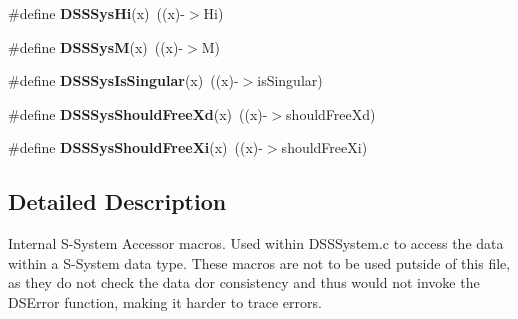 \begin{DoxyCompactItemize}
\item 
\hypertarget{group___d_s_s_sys_a_c_c_e_s_s_o_r_s_gaf5e511a390af70874397ef16b7224448}{
\#define {\bfseries DSSSysHi}(x)~((x)-\/$>$Hi)}
\label{group___d_s_s_sys_a_c_c_e_s_s_o_r_s_gaf5e511a390af70874397ef16b7224448}

\item 
\hypertarget{group___d_s_s_sys_a_c_c_e_s_s_o_r_s_ga7873f9a3eb4f5cd1cf9329d5c1823706}{
\#define {\bfseries DSSSysM}(x)~((x)-\/$>$M)}
\label{group___d_s_s_sys_a_c_c_e_s_s_o_r_s_ga7873f9a3eb4f5cd1cf9329d5c1823706}

\item 
\hypertarget{group___d_s_s_sys_a_c_c_e_s_s_o_r_s_ga105b46c63a24dec014dfe7072b56eac5}{
\#define {\bfseries DSSSysIsSingular}(x)~((x)-\/$>$isSingular)}
\label{group___d_s_s_sys_a_c_c_e_s_s_o_r_s_ga105b46c63a24dec014dfe7072b56eac5}

\item 
\hypertarget{group___d_s_s_sys_a_c_c_e_s_s_o_r_s_ga03d9bc589698f9ffecf61ca495f8d5b8}{
\#define {\bfseries DSSSysShouldFreeXd}(x)~((x)-\/$>$shouldFreeXd)}
\label{group___d_s_s_sys_a_c_c_e_s_s_o_r_s_ga03d9bc589698f9ffecf61ca495f8d5b8}

\item 
\hypertarget{group___d_s_s_sys_a_c_c_e_s_s_o_r_s_gadff503528fefd0a1338aaf3c3a0dbffd}{
\#define {\bfseries DSSSysShouldFreeXi}(x)~((x)-\/$>$shouldFreeXi)}
\label{group___d_s_s_sys_a_c_c_e_s_s_o_r_s_gadff503528fefd0a1338aaf3c3a0dbffd}

\end{DoxyCompactItemize}


\subsection{Detailed Description}
Internal S-\/System Accessor macros. Used within DSSSystem.c to access the data within a S-\/System data type. These macros are not to be used putside of this file, as they do not check the data dor consistency and thus would not invoke the DSError function, making it harder to trace errors. 